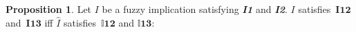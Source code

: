 \documentclass[conference]{IEEEtran}
\theoremstyle{plain}
\theoremstyle{remark}
\theoremstyle{definition}
\theoremstyle{proposition}
\newtheorem{proposition}[theorem]{Proposition}
\newcommand{\II}{\mathbb{I} }
\begin{document}
\begin{proposition}\label{cor-prop-int-imp-2}
Let $I$ be a fuzzy implication satisfying \emph{\textbf{I1}} and \emph{\textbf{I2}}. $I$ satisfies~$\mathbf{I12}$ and~$\mathbf{I13}$ iff $\widehat{I}$ satisfies~$\II\mathbf{12}$ and $\II\mathbf{13}$:
\end{proposition}

\end{document}
